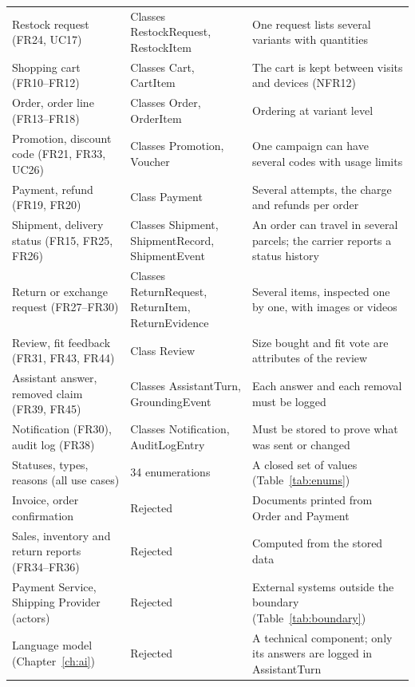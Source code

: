 {\begin{xltabular}{\textwidth}{@{}L{3.6cm} L{3.4cm} Y@{}}
Restock request (FR24, UC17) & Classes \textsf{RestockRequest}, \textsf{RestockItem} & One request lists several variants with quantities \\
Shopping cart (FR10--FR12) & Classes \textsf{Cart}, \textsf{CartItem} & The cart is kept between visits and devices (NFR12) \\
Order, order line (FR13--FR18) & Classes \textsf{Order}, \textsf{OrderItem} & Ordering at variant level \\
Promotion, discount code (FR21, FR33, UC26) & Classes \textsf{Promotion}, \textsf{Voucher} & One campaign can have several codes with usage limits \\
Payment, refund (FR19, FR20) & Class \textsf{Payment} & Several attempts, the charge and refunds per order \\
Shipment, delivery status (FR15, FR25, FR26) & Classes \textsf{Shipment}, \textsf{ShipmentRecord}, \textsf{ShipmentEvent} & An order can travel in several parcels; the carrier reports a status history \\
Return or exchange request (FR27--FR30) & Classes \textsf{ReturnRequest}, \textsf{ReturnItem}, \textsf{ReturnEvidence} & Several items, inspected one by one, with images or videos \\
Review, fit feedback (FR31, FR43, FR44) & Class \textsf{Review} & Size bought and fit vote are attributes of the review \\
Assistant answer, removed claim (FR39, FR45) & Classes \textsf{AssistantTurn}, \textsf{GroundingEvent} & Each answer and each removal must be logged \\
Notification (FR30), audit log (FR38) & Classes \textsf{Notification}, \textsf{AuditLogEntry} & Must be stored to prove what was sent or changed \\
Statuses, types, reasons (all use cases) & 34 enumerations & A closed set of values (Table~\ref{tab:enums}) \\
Invoice, order confirmation & Rejected & Documents printed from \textsf{Order} and \textsf{Payment} \\
Sales, inventory and return reports (FR34--FR36) & Rejected & Computed from the stored data \\
Payment Service, Shipping Provider (actors) & Rejected & External systems outside the boundary (Table~\ref{tab:boundary}) \\
Language model (Chapter~\ref{ch:ai}) & Rejected & A technical component; only its answers are logged in \textsf{AssistantTurn} \\
\end{xltabular}
}

